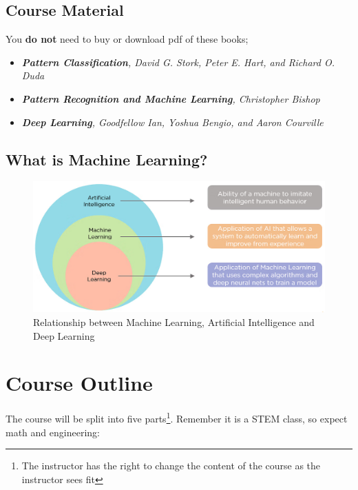 \documentclass{article}
\begin{document}
\subsection{Course Material}
You \textbf{do not} need to buy or download pdf of these books;
\begin{itemize}
    \item \textit{\textbf{Pattern Classification}, David G. Stork, Peter E. Hart, and Richard O. Duda}
    \item \textit{\textbf{Pattern Recognition and Machine Learning}, Christopher Bishop}
    \item  \textit{\textbf{Deep Learning}, Goodfellow Ian, Yoshua Bengio, and Aaron Courville}
\end{itemize}

\subsection{What is Machine Learning?}
\begin{figure}[H]
    \centering
    \includegraphics[scale=0.3]{image.png}
    \caption{Relationship between Machine Learning, Artificial Intelligence and Deep Learning}
\end{figure}
\section{Course Outline}
The course will be split into five parts\footnote{The instructor has the right to change the content of the course as the instructor sees fit}. Remember it is a STEM class, so expect math and engineering:
\end{document}
